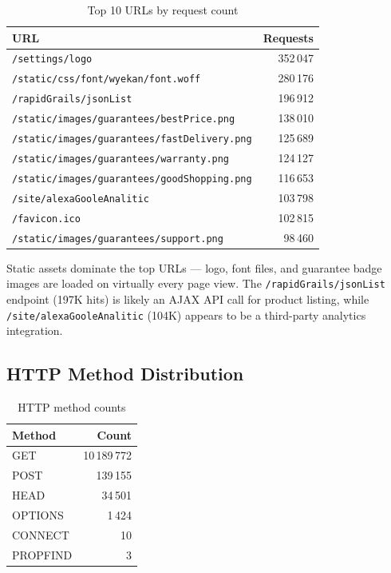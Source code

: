 \documentclass[12pt,a4paper]{article}
\begin{document}
\begin{table}[H]
\centering
\caption{Top 10 URLs by request count}
\footnotesize
\begin{tabular}{@{}lr@{}}
\hline
\textbf{URL} & \textbf{Requests} \\ \hline
\texttt{/settings/logo}                          & 352\,047 \\
\texttt{/static/css/font/wyekan/font.woff}       & 280\,176 \\
\texttt{/rapidGrails/jsonList}                    & 196\,912 \\
\texttt{/static/images/guarantees/bestPrice.png}  & 138\,010 \\
\texttt{/static/images/guarantees/fastDelivery.png} & 125\,689 \\
\texttt{/static/images/guarantees/warranty.png}   & 124\,127 \\
\texttt{/static/images/guarantees/goodShopping.png} & 116\,653 \\
\texttt{/site/alexaGooleAnalitic}                 & 103\,798 \\
\texttt{/favicon.ico}                             & 102\,815 \\
\texttt{/static/images/guarantees/support.png}    & 98\,460 \\
\hline
\end{tabular}
\end{table}

Static assets dominate the top URLs --- logo, font files, and guarantee badge images are loaded on virtually every page view. The \texttt{/rapidGrails/jsonList} endpoint (197K hits) is likely an AJAX API call for product listing, while \texttt{/site/alexaGooleAnalitic} (104K) appears to be a third-party analytics integration.

\subsection{HTTP Method Distribution}

\begin{table}[H]
\centering
\caption{HTTP method counts}
\begin{tabular}{@{}lr@{}}
\hline
\textbf{Method} & \textbf{Count} \\ \hline
GET      & 10\,189\,772 \\
POST     & 139\,155 \\
HEAD     & 34\,501 \\
OPTIONS  & 1\,424 \\
CONNECT  & 10 \\
PROPFIND & 3 \\
\hline
\end{tabular}
\end{table}
\end{document}
